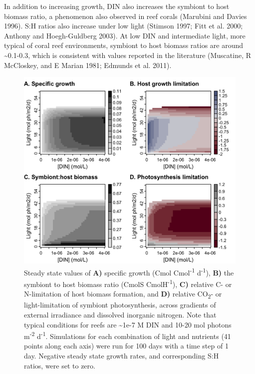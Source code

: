 \documentclass[]{elsarticle} %
\makeatletter
\def\maxwidth{\ifdim\Gin@nat@width>\linewidth\linewidth
\else\Gin@nat@width\fi}
\let\Oldincludegraphics\includegraphics
\renewcommand{\includegraphics}[1]{\Oldincludegraphics[width=\maxwidth]{#1}}
\makeatother
\begin{document}
In addition to increasing growth, DIN also increases the symbiont to
host biomass ratio, a phenomenon also observed in reef corals (Marubini
and Davies 1996). S:H ratios also increase under low light (Stimson
1997; Fitt et al. 2000; Anthony and Hoegh-Guldberg 2003). At low DIN and
intermediate light, more typical of coral reef environments, symbiont to
host biomass ratios are around \textasciitilde{}0.1-0.3, which is
consistent with values reported in the literature (Muscatine, R
McCloskey, and E Marian 1981; Edmunds et al. 2011).

\begin{figure}[htbp]
\centering
\includegraphics{../img/Fig2.png}
\caption{Steady state values of \textbf{A)} specific growth (Cmol
Cmol\textsuperscript{-1} d\textsuperscript{-1}), \textbf{B)} the
symbiont to host biomass ratio (CmolS CmolH\textsuperscript{-1}),
\textbf{C)} relative C- or N-limitation of host biomass formation, and
\textbf{D)} relative CO\textsubscript{2}- or light-limitation of
symbiont photosynthesis, across gradients of external irradiance and
dissolved inorganic nitrogen. Note that typical conditions for reefs are
\textasciitilde{}1e-7 M DIN and 10-20 mol photons m\textsuperscript{-2}
d\textsuperscript{-1}. Simulations for each combination of light and
nutrients (41 points along each axis) were run for 100 days with a time
step of 1 day. Negative steady state growth rates, and corresponding S:H
ratios, were set to zero.}
\end{figure}
\end{document}
